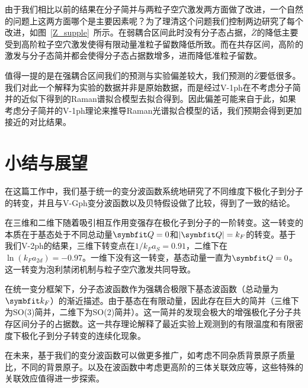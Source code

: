 由于我们相比以前的结果在分子简并与两粒子空穴激发两方面做了改进，一个自然的问题上这两方面哪个是主要因素呢？为了理清这个问题我们控制两边研究了每个改进，如图~\ref{Z_supple}~所示。在弱耦合区间此时没有分子态占据，$\bar{Z}$的降低主要受到高阶粒子空穴激发使得有限动量准粒子留数降低所致。而在共存区间，高阶的激发与分子态简并都会使得分子态占据数增多，进而降低准粒子留数。

值得一提的是在强耦合区间我们的预测与实验偏差较大，我们预测的$\bar{Z}$要低很多。我们对此一个解释为实验的数据并非是原始数据，而是经过V-1ph在不考虑分子简并的近似下得到的Raman谱拟合模型去拟合得到。因此偏差可能来自于此，如果考虑分子简并的V-1ph理论来推导Raman光谱拟合模型的话，我们预期会得到更加接近的对比结果。


\section{小结与展望}\label{3sec:sum}
在这篇工作中，我们基于统一的变分波函数系统地研究了不同维度下极化子到分子的转变，并且与V-Gph变分波函数以及贝特假设做了比较，得到了一致的结论。

在三维和二维下随着吸引相互作用变强存在极化子到分子的一阶转变。这一转变的本质在于基态处于不同总动量$\Vector{Q}=0$和$|\Vector{Q}|=k_F$的转变。基于我们V-2ph的结果，三维下转变点在$1/k_Fa_S=0.91$，二维下在$\ln(k_Fa_{2d})= -0.97$。一维下没有这一转变，基态动量一直为$\Vector{Q}=0$。这一转变为泡利禁闭机制与粒子空穴激发共同导致。

在统一变分框架下，分子态波函数作为强耦合极限下基态波函数（总动量为$\Vector{k_F}$）的渐近描述。由于基态在有限动量，因此存在巨大的简并（三维下为SO(3)简并，二维下为SO(2)简并）。这一简并的发现会极大的增强极化子分子共存区间分子的占据数。这一共存理论解释了最近实验上观测到的有限温度和有限密度下极化子到分子转变的连续化现象。

在未来，基于我们的变分波函数可以做更多推广，如考虑不同杂质背景原子质量比，不同的背景原子。以及在波函数中考虑更高阶的三体关联效应等，这些特殊的关联效应值得进一步探索。


